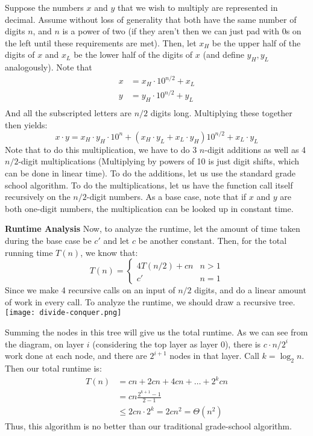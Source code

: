 \begin{algothm}
    Suppose the numbers $x$ and $y$ that we wish to multiply are represented in decimal. Assume without loss of generality
    that both have the same number of digits $n$, and $n$ is a power of two (if they aren't then we can just pad with $0$s on the left
    until these requirements are met). Then, let $x_H$ be the upper half of the digits of $x$ and $x_L$ be the lower half of the digits of
    $x$ (and define $y_H, y_L$ analogously). Note that
    \begin{align*}
        x &= x_H \cdot 10^{n/2} + x_L \\
        y &= y_H \cdot 10^{n/2} + y_L \\
    \end{align*}
    And all the subscripted letters are $n/2$ digits long.
    Multiplying these together then yields:
    \[ x\cdot y = x_H \cdot y_H \cdot 10^n + (x_H \cdot y_L + x_L \cdot y_H) 10^{n/2} + x_L \cdot y_L \]
    Note that to do this multiplication, we have to do 3 $n$-digit additions as well as 4 $n/2$-digit multiplications
    (Multiplying by powers of 10 is just digit shifts, which can be done in linear time). To do the additions, let us use the
    standard grade school algorithm. To do the multiplications, let us have the function call itself recursively on the $n/2$-digit numbers.
    As a base case, note that if $x$ and $y$ are both one-digit numbers, the multiplication can be looked up in constant time.

    \textbf{Runtime Analysis} Now, to analyze the runtime, let the amount of time taken during the base case be $c'$ and let $c$ be another constant.
    Then, for the total running time $T(n)$, we know that:
    \[ T(n) = \begin{cases}
        4T(n/2) + cn & n > 1 \\
        c' & n = 1
    \end{cases} \]
    Since we make 4 recursive calls on an input of $n/2$ digits, and do a linear amount of work in every call. To analyze the runtime, we should draw
    a recursive tree.
    \\
    \texttt{[image: divide-conquer.png]}

    Summing the nodes in this tree will give us the total runtime.
    As we can see from the diagram, on layer $i$ (considering the top layer as layer 0), there is $c \cdot n/2^i$
    work done at each node, and there are $2^{i + 1}$ nodes in that layer. Call $k = \log_2 n$. Then our total runtime is:
    \begin{align*}
        T(n) &= cn + 2cn + 4cn + \dots + 2^k  cn  \\
        &= cn \frac{2^{k + 1} - 1}{2 - 1} \\
        &\leq 2cn \cdot 2^k = 2cn^2 = \Theta(n^2)
    \end{align*}
    Thus, this algorithm is no better than our traditional grade-school algorithm.
\end{algothm}

